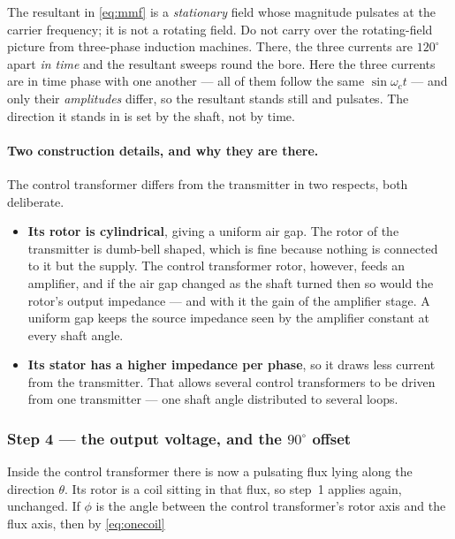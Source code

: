 \documentclass[11pt,a4paper]{article}
\begin{document}
\begin{pitfall}
The resultant in \eqref{eq:mmf} is a \emph{stationary} field whose magnitude
pulsates at the carrier frequency; it is not a rotating field. Do not carry
over the rotating-field picture from three-phase induction machines. There,
the three currents are $120^\circ$ apart \emph{in time} and the resultant
sweeps round the bore. Here the three currents are in time phase with one
another --- all of them follow the same $\sin\omega_{c}t$ --- and only their
\emph{amplitudes} differ, so the resultant stands still and pulsates. The
direction it stands in is set by the shaft, not by time.
\end{pitfall}

\paragraph{Two construction details, and why they are there.} The control
transformer differs from the transmitter in two respects, both deliberate.

\begin{itemize}[leftmargin=1.5em,itemsep=2pt]
\item \textbf{Its rotor is cylindrical}, giving a uniform air gap. The rotor
      of the transmitter is dumb-bell shaped, which is fine because nothing is
      connected to it but the supply. The control transformer rotor, however,
      feeds an amplifier, and if the air gap changed as the shaft turned then
      so would the rotor's output impedance --- and with it the gain of the
      amplifier stage. A uniform gap keeps the source impedance seen by the
      amplifier constant at every shaft angle.
\item \textbf{Its stator has a higher impedance per phase}, so it draws less
      current from the transmitter. That allows several control transformers
      to be driven from one transmitter --- one shaft angle distributed to
      several loops.
\end{itemize}

\subsubsection{Step 4 --- the output voltage, and the $90^\circ$ offset}
\label{sss:output}

Inside the control transformer there is now a pulsating flux lying along the
direction $\theta$. Its rotor is a coil sitting in that flux, so step~1
applies again, unchanged. If $\phi$ is the angle between the control
transformer's rotor axis and the flux axis, then by \eqref{eq:onecoil}
\end{document}
